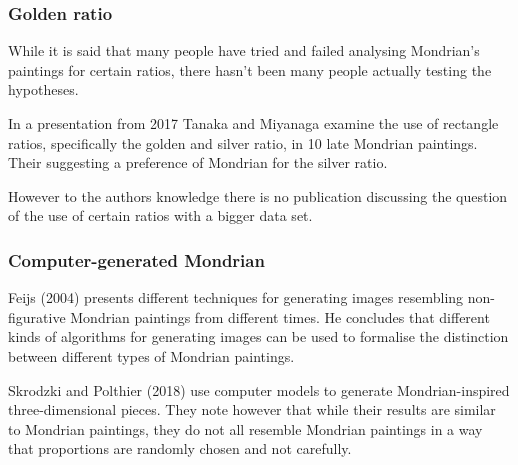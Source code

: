 \subsubsection{Golden ratio}

\cite{Livio2002}

While it is said that many people have tried and failed analysing Mondrian's
paintings for certain ratios, there hasn't been many people actually testing
the hypotheses.

In a presentation from 2017 Tanaka and Miyanaga \cite{Tanaka2017} examine the use
of rectangle ratios, specifically the golden and silver ratio, in 10 late
Mondrian paintings. Their suggesting a preference of Mondrian for the silver
ratio.

However to the authors knowledge there is no publication discussing the question of
the use of certain ratios with a bigger data set.

\subsubsection{Computer-generated Mondrian}



Feijs (2004)\cite{Feijs2004} presents different techniques for generating images
resembling non-figurative Mondrian paintings from different times. He  concludes
that different kinds of algorithms for generating images can be used to
formalise the distinction between different types of Mondrian paintings.


Skrodzki and Polthier (2018) \cite{Skrodzki2018} use computer models to generate
Mondrian-inspired three-dimensional pieces. They note however that while their
results are similar to Mondrian paintings, they do not all resemble Mondrian
paintings in a way that proportions are randomly chosen and not carefully.
